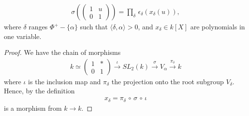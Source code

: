 \begin{lemma} \label{claim1}
\begin{align*}
\sigma\left(\left(\begin{matrix} 1 & u \\ 0 & 1 \end{matrix}\right)\right) = \prod_\delta\, \epsilon_\delta\left(x_\delta\left(u\right)\right),
\end{align*}
where $\delta$ ranges $\Phi^+ - \{\alpha\}$ such that $\langle \delta, \alpha \rangle > 0$, and $x_\delta\in k[X]$ are polynomials in one variable.
\end{lemma}
\begin{proof}
We have the chain of morphisms
\begin{align*}
k\simeq \left(\begin{matrix}1 & * \\ 0 & 1\end{matrix}\right) 
\stackrel{\iota}\longrightarrow SL_2(k) 
\stackrel{\sigma}\longrightarrow V_\alpha 
\stackrel{\pi_\delta}\longrightarrow k
\end{align*}
where $\iota$ is the inclusion map and $\pi_\delta$ the projection onto the root subgroup $V_\delta$. Hence, by the definition
\begin{align*}
x_\delta = \pi_\delta\, \circ\, \sigma\, \circ\, \iota
\end{align*}
is a morphism from $k \rightarrow k$.


\end{proof}
